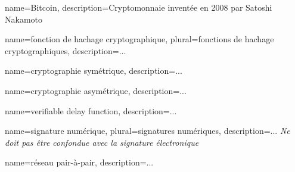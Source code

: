 {
    name=Bitcoin,
    description={Cryptomonnaie inventée en 2008 par Satoshi Nakamoto}
}

{
    name=fonction de hachage cryptographique,
    plural=fonctions de hachage cryptographiques,
    description={...}
}

{
    name=cryptographie symétrique,
    description={...}
}

{
    name=cryptographie asymétrique,
    description={...}
}

{
    name=verifiable delay function,
    description={...}
}

{
    name=signature numérique,
    plural=signatures numériques,
    description={... \textit{Ne doit pas être confondue avec la signature électronique}}
}

{
    name=réseau pair-à-pair,
    description={...}
}

